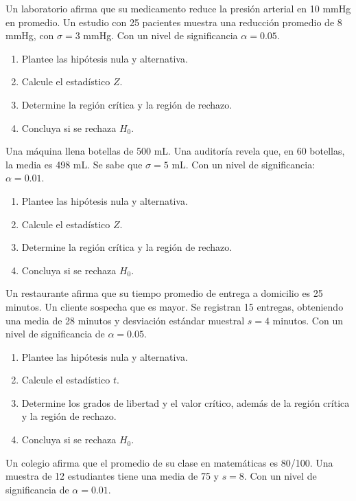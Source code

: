 \documentclass[addpoints,12pt]{exam}
\theoremstyle{plain}
\theoremstyle{remark}
\theoremstyle{definition}
\begin{document}
\begin{questions}
 \question Un laboratorio afirma que su medicamento reduce la presión arterial en 10 mmHg en promedio. Un estudio con 25 pacientes muestra una reducción promedio de 8 mmHg, con \( \sigma = 3 \) mmHg. Con un nivel de significancia \( \alpha = 0.05 \).  

\begin{enumerate}[$1.$]
\item Plantee las hipótesis nula y alternativa.  
\item Calcule el estadístico \( Z \).  
\item Determine la región crítica y la región de rechazo.  
\item Concluya si se rechaza \( H_0 \).  
\end{enumerate}

 \question Una máquina llena botellas de 500 mL. Una auditoría revela que, en 60 botellas, la media es 498 mL. Se sabe que \( \sigma = 5 \) mL.  Con un nivel de significancia: \( \alpha = 0.01 \).  

\begin{enumerate}[$1.$]
\item Plantee las hipótesis nula y alternativa.  
\item Calcule el estadístico \( Z \).  
\item Determine la región crítica y la región de rechazo.  
\item Concluya si se rechaza \( H_0 \).  
\end{enumerate}


 \question Un restaurante afirma que su tiempo promedio de entrega a domicilio es 25 minutos. Un cliente sospecha que es mayor. Se registran 15 entregas, obteniendo una media de 28 minutos y desviación estándar muestral \( s = 4 \) minutos. Con un nivel de significancia de \( \alpha = 0.05 \).  

\begin{enumerate}[$1.$]
\item Plantee las hipótesis nula y alternativa.  
\item Calcule el estadístico \( t \).  
\item Determine los grados de libertad y el valor crítico, además de la región crítica y la región de rechazo.  
\item Concluya si se rechaza \( H_0 \).  
\end{enumerate}

 \question Un colegio afirma que el promedio de su clase en matemáticas es 80/100. Una muestra de 12 estudiantes tiene una media de 75 y \( s = 8 \). Con un nivel de significancia de \( \alpha = 0.01 \). 


\end{questions}
\end{document}
